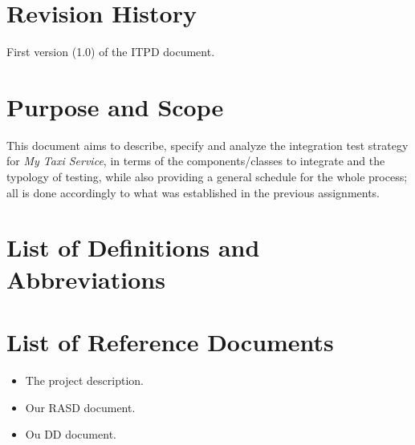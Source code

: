 
\section{Revision History}
First version (1.0) of the ITPD document.
\section{Purpose and Scope}
This document aims to describe, specify and analyze the integration test strategy for \textit{My Taxi Service}, 
in terms of the components/classes to integrate and the typology of testing, while also providing a 
general schedule for the whole process; all is done accordingly to what was established in the previous assignments. \\


\section{List of Definitions and Abbreviations}


\section{List of Reference Documents}
\begin{itemize}
\item The project description.
\item Our RASD document.
\item Ou DD document.
\end{itemize}
